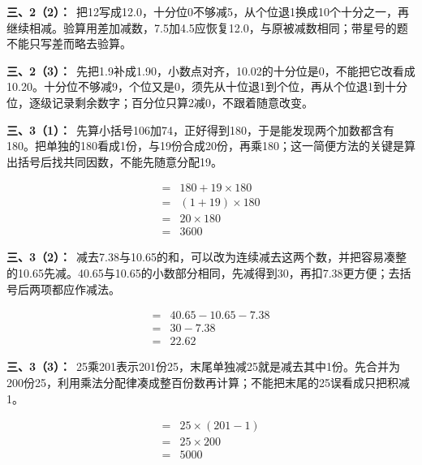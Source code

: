 \documentclass[multi=snippet,border=0pt]{standalone}
\newenvironment{snippet}[3]{\begin{minipage}{#1bp}\color{answerred}\fontsize{#2}{#3}\selectfont\raggedright}{\end{minipage}}
\begin{document}
\begin{snippet}{505}{11.5}{14}\textbf{三、2（2）：}\ 把12写成12.0，十分位0不够减5，从个位退1换成10个十分之一，再继续相减。验算用差加减数，7.5加4.5应恢复12.0，与原被减数相同；带星号的题不能只写差而略去验算。\end{snippet}
\begin{snippet}{505}{11.5}{14}\textbf{三、2（3）：}\ 先把1.9补成1.90，小数点对齐，10.02的十分位是0，不能把它改看成10.20。十分位不够减9，个位又是0，须先从十位退1到个位，再从个位退1到十分位，逐级记录剩余数字；百分位只算2减0，不跟着随意改变。\end{snippet}
\begin{snippet}{505}{11.5}{14}\textbf{三、3（1）：}\ 先算小括号106加74，正好得到180，于是能发现两个加数都含有180。把单独的180看成1份，与19份合成20份，再乘180；这一简便方法的关键是算出括号后找共同因数，不能先随意分配19。\end{snippet}
\begin{snippet}{199.567}{10.5}{12.8}\[\begin{aligned}={}&180+19\times180\\={}&(1+19)\times180\\={}&20\times180\\={}&3600\end{aligned}\]\end{snippet}
\begin{snippet}{505}{11.5}{14}\textbf{三、3（2）：}\ 减去7.38与10.65的和，可以改为连续减去这两个数，并把容易凑整的10.65先减。40.65与10.65的小数部分相同，先减得到30，再扣7.38更方便；去括号后两项都应作减法。\end{snippet}
\begin{snippet}{191.233}{10.5}{12.8}\[\begin{aligned}={}&40.65-10.65-7.38\\={}&30-7.38\\={}&22.62\end{aligned}\]\end{snippet}
\begin{snippet}{505}{11.5}{14}\textbf{三、3（3）：}\ 25乘201表示201份25，末尾单独减25就是减去其中1份。先合并为200份25，利用乘法分配律凑成整百份数再计算；不能把末尾的25误看成只把积减1。\end{snippet}
\begin{snippet}{200.067}{10.5}{12.8}\[\begin{aligned}={}&25\times(201-1)\\={}&25\times200\\={}&5000\end{aligned}\]\end{snippet}
\end{document}
